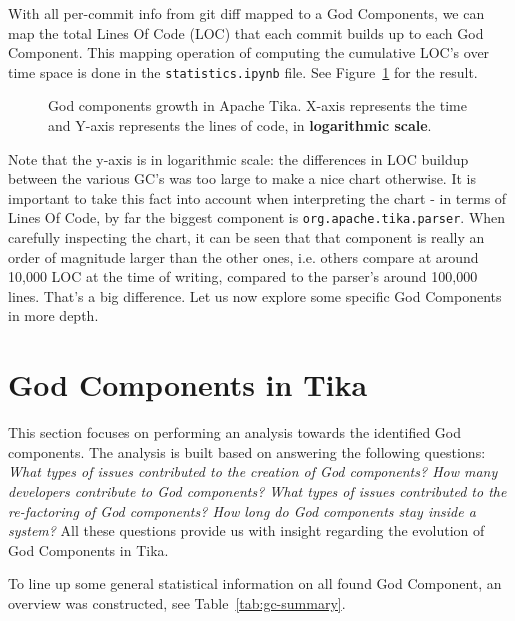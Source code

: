 \documentclass{article}
\begin{document}
With all per-commit info from git diff mapped to a God Components, we can map the total Lines Of Code (LOC) that each commit builds up to each God Component. This mapping operation of computing the cumulative LOC's over time space is done in the \texttt{statistics.ipynb} file. See Figure~\ref{fig:loc_growth} for the result.

\begin{figure}[H]
    \centering
    
    \caption{God components growth in Apache Tika. X-axis represents the time and Y-axis represents the lines of code, in \textbf{logarithmic scale}.}
    \label{fig:loc_growth}
\end{figure}

Note that the y-axis is in logarithmic scale: the differences in LOC buildup between the various GC's was too large to make a nice chart otherwise. It is important to take this fact into account when interpreting the chart - in terms of Lines Of Code, by far the biggest component is \texttt{org.apache.tika.parser}. When carefully inspecting the chart, it can be seen that that component is really an order of magnitude larger than the other ones, i.e. others compare at around 10,000 LOC at the time of writing, compared to the parser's around 100,000 lines. That's a big difference. Let us now explore some specific God Components in more depth.

\section{God Components in Tika}
This section focuses on performing an analysis towards the identified God components. The analysis is built based on answering the following questions: \textit{What types of issues contributed to the creation of God components? How many developers contribute to God components? What types of issues contributed to the re-factoring of God components? How long do God components stay inside a system?} All these questions provide us with insight regarding the evolution of God Components in Tika.

To line up some general statistical information on all found God Component, an overview was constructed, see Table~\ref{tab:gc-summary}.
\end{document}

